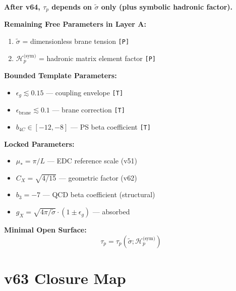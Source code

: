 \documentclass[11pt,a4paper]{article}
\newcommand{\tagP}{\textcolor{orange!80!black}{\texttt{[P]}}}
\newcommand{\tagT}{\textcolor{cyan!70!black}{\texttt{[T]}}}
\theoremstyle{definition}
\begin{document}
\begin{opensurfacebox}
\textbf{After v64, $\tau_p$ depends on $\tilde{\sigma}$ only (plus symbolic hadronic factor).}

\textbf{Remaining Free Parameters in Layer A:}
\begin{enumerate}
  \item $\tilde{\sigma}$ = dimensionless brane tension \tagP{}
  \item $\mathcal{H}_p^{\text{(sym)}}$ = hadronic matrix element factor \tagP{}
\end{enumerate}

\textbf{Bounded Template Parameters:}
\begin{itemize}
  \item $\epsilon_g \lesssim 0.15$ --- coupling envelope \tagT{}
  \item $\epsilon_{\text{brane}} \lesssim 0.1$ --- brane correction \tagT{}
  \item $b_{4C} \in [-12, -8]$ --- PS beta coefficient \tagT{}
\end{itemize}

\textbf{Locked Parameters:}
\begin{itemize}
  \item $\mu_* = \pi/L$ --- EDC reference scale (v51)
  \item $C_X = \sqrt{4/15}$ --- geometric factor (v62)
  \item $b_3 = -7$ --- QCD beta coefficient (structural)
  \item $g_X = \sqrt{4\pi/\tilde{\sigma}} \cdot (1 \pm \epsilon_g)$ --- absorbed
\end{itemize}

\textbf{Minimal Open Surface:}
\begin{equation}
\label{eq:open-surface-minimal}
\boxed{\tau_p = \tau_p(\tilde{\sigma}; \mathcal{H}_p^{\text{(sym)}})}
\end{equation}
\end{opensurfacebox}

\section{v63 Closure Map}
\label{sec:closure-map}
\end{document}
